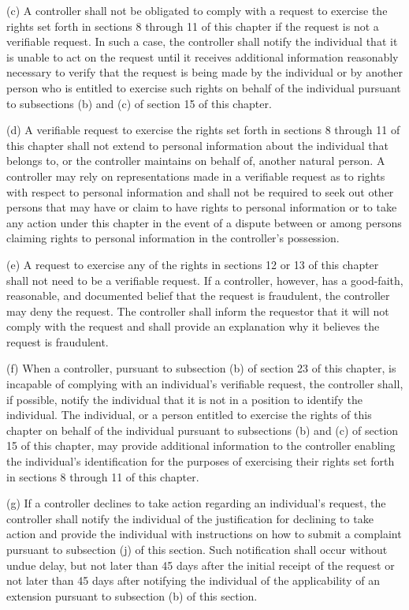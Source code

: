 (c) A controller shall not be obligated to comply with a request to exercise the rights set forth in sections 8 through 11 of this chapter if the request is not a verifiable request. In such a case, the controller shall notify the individual that it is unable to act on the request until it receives additional information reasonably necessary to verify that the request is being made by the individual or by another person who is entitled to exercise such rights on behalf of the individual pursuant to subsections (b) and (c) of section 15 of this chapter.

(d) A verifiable request to exercise the rights set forth in sections 8 through 11 of this chapter shall not extend to personal information about the individual that belongs to, or the controller maintains on behalf of, another natural person. A controller may rely on representations made in a verifiable request as to rights with respect to personal information and shall not be required to seek out other persons that may have or claim to have rights to personal information or to take any action under this chapter in the event of a dispute between or among persons claiming rights to personal information in the controller’s possession. 

(e) A request to exercise any of the rights in sections 12 or 13 of this chapter shall not need to be a verifiable request. If a controller, however, has a good-faith, reasonable, and documented belief that the request is fraudulent, the controller may deny the request. The controller shall inform the requestor that it will not comply with the request and shall provide an explanation why it believes the request is fraudulent.

(f) When a controller, pursuant to subsection (b) of section 23 of this chapter, is incapable of complying with an individual’s verifiable request, the controller shall, if possible, notify the individual that it is not in a position to identify the individual. The individual, or a person entitled to exercise the rights of this chapter on behalf of the individual pursuant to subsections (b) and (c) of section 15 of this chapter, may provide additional information to the controller enabling the individual’s identification for the purposes of exercising their rights set forth in sections 8 through 11 of this chapter. 

(g) If a controller declines to take action regarding an individual’s request, the controller shall notify the individual of the justification for declining to take action and provide the individual with instructions on how to submit a complaint pursuant to subsection (j) of this section. Such notification shall occur without undue delay, but not later than 45 days after the initial receipt of the request or not later than 45 days after notifying the individual of the applicability of an extension pursuant to subsection (b) of this section.  

